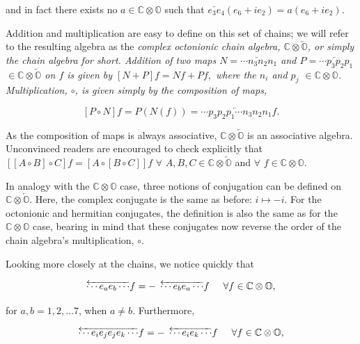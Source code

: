 \documentclass[letterpaper,12pt,titlepage,oneside,final]{book}
\newcommand{\CO}{\mathbb{C}\otimes\mathbb{O}}
\newcommand{\COOO}{\mathbb{C}\otimes\overleftarrow{\mathbb{O}}}
\begin{document}
\noindent and in fact there exists no $a \in \mathbb{C}\otimes\mathbb{O}$ such that $\overleftarrow{e_{3}e_{4}}\left( e_6+ie_2 \right) = a \left( e_6+ie_2 \right)$.

Addition and multiplication are easy to define on this set of chains; we will refer to the resulting algebra as the \it complex octonionic chain algebra, \rm $\mathbb{C}\otimes\overleftarrow{\mathbb{O}}$, or simply the \it chain algebra \rm for short.  Addition of two maps $N =\overleftarrow{\cdots n_3 n_2 n_1}$ and $P=\overleftarrow{\cdots p_3 p_2 p_1}$ $\in \mathbb{C}\otimes\overleftarrow{\mathbb{O}}$ on $f$ is given by $\left[N+P\right]f = Nf+Pf,$ where the $n_i$ and $p_j$ $\in \mathbb{C}\otimes\mathbb{O}$.  Multiplication, $\circ$, is given simply by the composition of maps,

\begin{equation}\left[P\circ N\right]f =P(N(f))= \overleftarrow{\cdots p_3 p_2 p_1\cdots n_3 n_2 n_1}f.
\end{equation}

As the composition of maps is always associative, $\mathbb{C}\otimes\overleftarrow{\mathbb{O}}$ is an associative algebra. Unconvinced readers are encouraged to check explicitly that $ \left[\left[A \circ B\right] \circ C \right]f = \left[A \circ \left[B \circ C \right]\right]f$ $\forall$ $A,B,C\in \mathbb{C}\otimes\overleftarrow{\mathbb{O}}$ and $\forall$ $f\in\mathbb{C}\otimes\mathbb{O}$.

In analogy with the $\CO$ case, three notions of conjugation can be defined on $\COOO$.  Here, the complex conjugate is the same as before: $i\mapsto -i$.  For the octonionic and hermitian conjugates, the definition is also the same as for the $\CO$ case, bearing in mind that these conjugates now reverse the order of the chain algebra's multiplication, $\circ$.


Looking more closely at the chains, we notice quickly that

\begin{equation}\label{flip}
\overleftarrow{\cdots e_ae_b\cdots} f = -\hspace{1.5mm}\overleftarrow{\cdots e_be_a\cdots} f \hspace{0.5cm} \forall f \in \mathbb{C}\otimes\mathbb{O},
\end{equation}

\noindent for $a,b = 1,2,\dots 7$, when $a\neq b$.  Furthermore,

\begin{equation}\label{snip}
\overleftarrow{\cdots e_ie_je_je_k\cdots} f = -\hspace{1.5mm}\overleftarrow{\cdots e_ie_k\cdots} f \hspace{0.5cm} \forall f \in \mathbb{C}\otimes\mathbb{O},
\end{equation}
\end{document}
